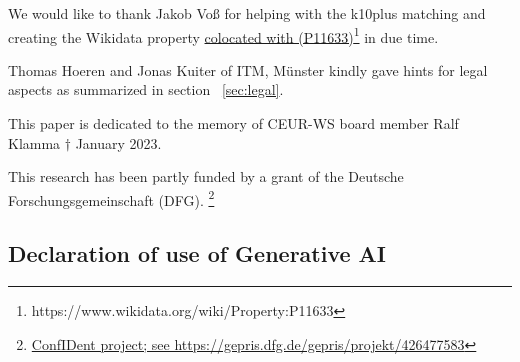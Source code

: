 \documentclass[runningheads]{llncs}
\newcommand{\footnotelink}[2]{\href{#1}{#2}\footnote{#1}}
\newcommand{\wdp}[2]{\footnotelink{https://www.wikidata.org/wiki/Property:#2}{#1 (#2)}}
\begin{document}
We would like to thank Jakob Voß for helping with the k10plus matching and creating the Wikidata property \wdp{colocated with}{P11633} in due time.

Thomas Hoeren and Jonas Kuiter of ITM, Münster kindly gave hints for legal aspects as summarized in section ~\ref{sec:legal}.

This paper is dedicated to the memory of CEUR-WS board member Ralf Klamma $\dag$ January 2023.

This research has been partly funded by a grant of the Deutsche Forschungsgemeinschaft (DFG). \footnote{\href{https://gepris.dfg.de/gepris/projekt/426477583}{ConfIDent project; see https://gepris.dfg.de/gepris/projekt/426477583}}

\subsection{Declaration of use of Generative AI}




\end{document}
